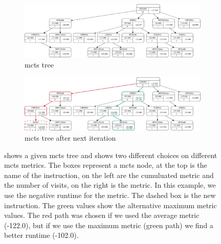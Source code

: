 \begin{figure}[p]
    \centering
    \begin{subfigure}[b]{0.3\textwidth}
        \centering
        \includegraphics[width=17.5cm,angle=90]{data/mcts-max-vs-avg/svg/selected/8752639012199.pdf}
        \caption{\ac{mcts} tree}
        \label{fig:approach:max-vs-avg:a}
    \end{subfigure}
    \hspace{0.2\textwidth}
    \begin{subfigure}[b]{0.3\textwidth}
        \centering
        \includegraphics[width=17.5cm,angle=90]{data/mcts-max-vs-avg/svg/selected/8752639012199-next.pdf}
        \caption{\ac{mcts} tree after next iteration}
        \label{fig:approach:max-vs-avg:b}
    \end{subfigure}
    \caption[\ac{mcts} tree with the consequences of maximum and average metric]{
         shows a given \ac{mcts} tree and  shows two different choices on different \ac{mcts} metrics.
        The boxes represent a \ac{mcts} node, at the top is the name of the instruction, on the left are the cumuluated metric and the number of visits, on the right is the metric.
        In this example, we use the negative runtime for the metric.
        The dashed box is the new instruction.
        The green values show the alternative maximum metric values.
        The red path was chosen if we used the average metric (-122.0), but if we use the maximum metric (green path) we find a better runtime (-102.0).
    }
    \label{fig:approach:max-vs-avg}
\end{figure}

